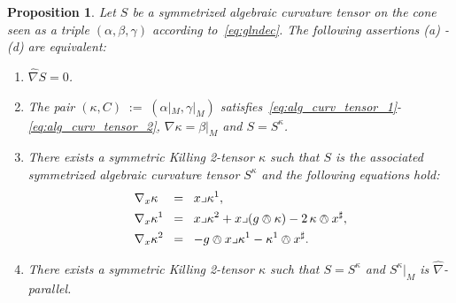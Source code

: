 \documentclass[11pt,a4paper]{article}
\theoremstyle{plain}
\newtheorem{proposition}{Proposition}
\theoremstyle{remark}
\begin{document}
\bigskip
\begin{proposition}\label{p:prolong}
Let $S$ be a symmetrized algebraic curvature tensor on the cone seen as a triple $(\alpha,\beta,\gamma)$ 
according to~\eqref{eq:glndec}. The following assertions (a) - (d) are equivalent:
\begin{enumerate}
\item  $\hat\nabla S = 0$.
\item The pair $(\kappa,C)\;:=\;(\alpha|_M,\gamma|_M)$ satisfies~\eqref{eq:alg_curv_tensor_1}-\eqref{eq:alg_curv_tensor_2}, $\nabla\kappa = \beta|_M$ and $S =S^\kappa$.
\item There exists a symmetric Killing 2-tensor $\kappa$ such that $S$ is the associated
  symmetrized algebraic curvature tensor $S^\kappa$ and the following equations hold:
\begin{align}
\label{eq:prolong_1_speziell}
\nabla_x \kappa\;\, &\;\;=\;\;x\lrcorner \kappa^1,\\
\label{eq:prolong_2_speziell}
\nabla_x\kappa^1 &\;\;=\;\;x\lrcorner \kappa^2 + x\lrcorner (g\owedge \kappa) - 2\, \kappa\owedge x^\sharp ,\\
\label{eq:prolong_3_speziell}
\nabla_x \kappa^2 &\;\;=\;\;-  g\owedge x\lrcorner \kappa^1  - \kappa^1\owedge  x^\sharp .
\end{align}
\item There exists a symmetric Killing 2-tensor $\kappa$ such that $S = S^\kappa$ and  $S^\kappa|_M$ is $\hat\nabla$-parallel.
\end{enumerate}
\end{proposition}
\end{document}

